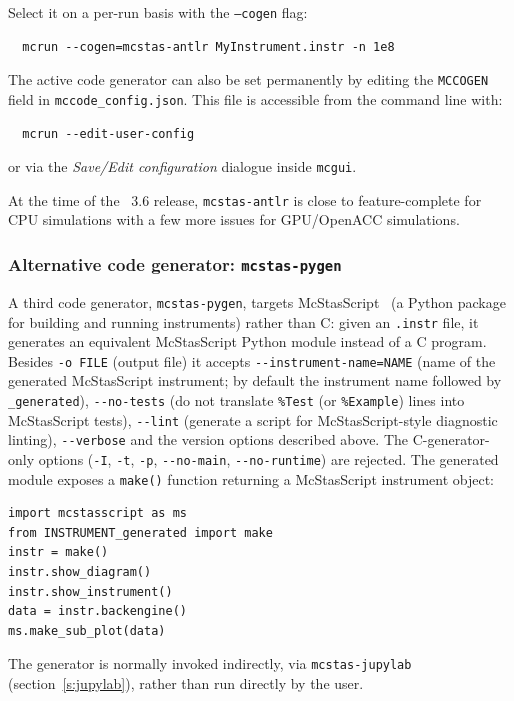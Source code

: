 Select it on a per-run basis with the \texttt{--cogen} flag:
\begin{verbatim}
  mcrun --cogen=mcstas-antlr MyInstrument.instr -n 1e8
\end{verbatim}

The active code generator can also be set permanently by editing the
\texttt{MCCOGEN} field in \texttt{mccode\_config.json}.  This file is
accessible from the command line with:
\begin{verbatim}
  mcrun --edit-user-config
\end{verbatim}
or via the \emph{Save/Edit configuration} dialogue inside \texttt{mcgui}.

At the time of the \MCS~3.6 release, \texttt{mcstas-antlr} is close to
feature-complete for CPU simulations with a few more issues for GPU/OpenACC
simulations.

\subsubsection*{Alternative code generator: \texttt{mcstas-pygen}}

A third code generator, \texttt{mcstas-pygen}, targets
McStasScript~\cite{mcstasscript} (a Python package for building and running
\MCS instruments) rather than C: given an \texttt{.instr} file, it generates
an equivalent McStasScript Python module instead of a C program. Besides
\verb+-o FILE+ (output file) it accepts \verb+--instrument-name=NAME+ (name of
the generated McStasScript instrument; by default the instrument name followed
by \texttt{\_generated}), \verb+--no-tests+ (do not translate
\texttt{\%Test} (or \texttt{\%Example}) lines into McStasScript tests), \verb+--lint+ (generate a
script for McStasScript-style diagnostic linting), \verb+--verbose+ and the
version options described above. The C-generator-only options (\verb+-I+,
\verb+-t+, \verb+-p+, \verb+--no-main+, \verb+--no-runtime+) are rejected.
The generated module exposes a \texttt{make()} function returning a
McStasScript instrument object:
\begin{lstlisting}
import mcstasscript as ms
from INSTRUMENT_generated import make
instr = make()
instr.show_diagram()
instr.show_instrument()
data = instr.backengine()
ms.make_sub_plot(data)
\end{lstlisting}
The generator is normally invoked indirectly, via \texttt{mcstas-jupylab}
(section~\ref{s:jupylab}), rather than run directly by the user.



